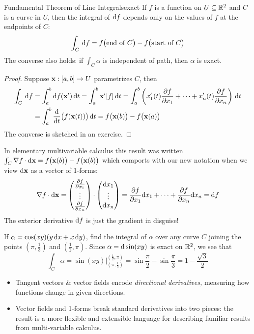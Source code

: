 \begin{thm}{Fundamental Theorem of Line Integrals}{exact}
	If $f$ is a function on $U\subseteq\R^2$ and $C$ is a curve in $U$, then the integral of $\df$ depends only on the values of $f$ at the endpoints of $C$:
	\[
		\int_{C}\,\df=f\bigl(\text{end of $C$}\bigr)-f\bigl(\text{start of $C$}\bigr)
	\]
	The converse also holds: if $\int_C\alpha$ is independent of path, then $\alpha$ is exact.
\end{thm}

\begin{proof}
	Suppose $\vx:[a,b]\to U$ parametrizes $C$, then
	\begin{align*}
		\int_{C}\,\df&=\int_a^b\df(\vx')\,\dt=\int_a^b\vx'[f]\,\dt =\int_a^b\left(x_1'(t)\partials[f]{x_1}+\cdots+x_n'(t)\partials[f]{x_n}\right)\,\dt\\
		&=\int_a^b\diff{t}\bigl(f(\vx(t))\bigr)\,\dt =f\bigl(\vx(b)\bigr)-f\bigl(\vx(a)\bigr)
	\end{align*}
	The converse is sketched in an exercise.
\end{proof}

In elementary multivariable calculus this result was written $\int_C\nabla f\cdot\dvx=f\bigl(\vx(b)\bigr)-f\bigl(\vx(b)\bigr)$ which comports with our new notation when we view $\dvx$ as a vector of 1-forms:
\[
	\nabla f\cdot\dvx=\threevec{\partials[f]{x_1}}{\vdots}{\partials[f]{x_n}}\cdot\threevec{\dx_1}{\vdots}{\dx_n}=\partials[f]{x_1}\dx_1+\cdots+\partials[f]{x_n}\dx_n =\df
\]
The exterior derivative $\df$ is just the gradient in disguise!

\begin{example}{}{}
	If $\alpha=\cos(xy)(y\,\dx+x\,\dy)$, find the integral of $\alpha$ over any curve $C$ joining the points $\left(\pi,\frac 13\right)$ and $\left(\frac 12,\pi\right)$. Since $\alpha=\D\sin(xy)$ is exact on $\R^2$, we see that
	\[
		\int_C\alpha=\sin(xy)\Bigr|_{\left(\pi,\frac 13\right)}^{\left(\frac 12,\pi\right)}=\sin\frac \pi 2-\sin\frac \pi 3=1-\frac{\sqrt 3}2
	\]
\end{example}



\begin{itemize}\itemsep0pt
  \item Tangent vectors \& vector fields encode \emph{directional derivatives,} measuring how functions change in given directions.
  
  \item Vector fields and 1-forms break standard derivatives into two pieces: the result is a more flexible and extensible language for describing familiar results from multi-variable calculus.
\end{itemize}

